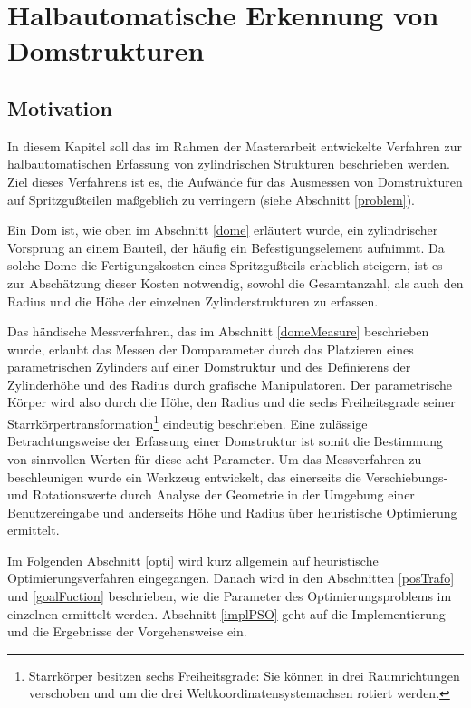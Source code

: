 \chapter{Halbautomatische Erkennung von Domstrukturen}
\label{cha:psoDomes}	
	

\section{Motivation}

In diesem Kapitel soll das im Rahmen der Masterarbeit entwickelte Verfahren zur halbautomatischen Erfassung 
von zylindrischen Strukturen beschrieben werden. Ziel dieses Verfahrens ist es, die Aufw\"ande f\"ur das Ausmessen von Domstrukturen auf Spritzgu{\ss}teilen ma{\ss}geblich zu verringern (siehe Abschnitt \ref{problem}). 

Ein Dom ist, wie oben im Abschnitt \ref{dome} erl\"autert wurde, ein zylindrischer Vorsprung an einem Bauteil, der h\"aufig ein Befestigungselement aufnimmt. Da solche Dome die Fertigungskosten eines Spritzgu{\ss}teils erheblich steigern, ist es zur Absch\"atzung dieser Kosten notwendig, sowohl die Gesamtanzahl, als auch den Radius und die H\"ohe der einzelnen Zylinderstrukturen zu erfassen.

Das h\"andische Messverfahren, das im Abschnitt \ref{domeMeasure} beschrieben wurde, erlaubt das Messen der Domparameter durch das Platzieren eines parametrischen Zylinders auf einer Domstruktur und des Definierens der Zylinderh\"ohe und des Radius durch grafische Manipulatoren. 
Der parametrische K\"orper wird also durch die H\"ohe, den Radius und die sechs Freiheitsgrade seiner Starrk\"orpertransformation\footnote{Starrkörper besitzen sechs Freiheitsgrade: Sie können in drei Raumrichtungen
verschoben und um die drei Weltkoordinatensystemachsen rotiert werden.} eindeutig beschrieben. Eine zul\"assige Betrachtungsweise der Erfassung einer Domstruktur ist somit die Bestimmung von sinnvollen Werten für diese acht Parameter. Um das Messverfahren zu beschleunigen wurde ein Werkzeug entwickelt, das einerseits die Verschiebungs- und
Rotationswerte durch Analyse der Geometrie in der Umgebung einer Benutzereingabe und anderseits H\"ohe und Radius über heuristische Optimierung ermittelt.

Im Folgenden Abschnitt \ref{opti} wird kurz allgemein auf heuristische Optimierungsverfahren eingegangen. Danach wird in den Abschnitten  \ref{posTrafo} und \ref{goalFuction} beschrieben, wie die Parameter des Optimierungsproblems im einzelnen ermittelt werden. Abschnitt \ref{implPSO} geht auf die Implementierung und die Ergebnisse der Vorgehensweise ein.


